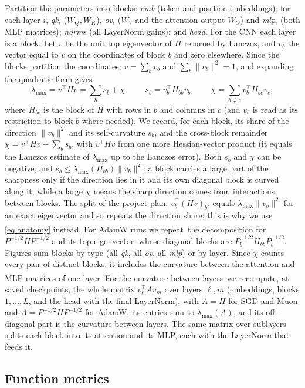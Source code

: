 \documentclass[10pt]{article}
\newcommand{\extra}{\textsuperscript{\dag}}  %
\newcommand{\lmax}{\lambda_{\max}}
\begin{document}
Partition the parameters into blocks: \emph{emb} (token and position embeddings); for each layer $i$,
\emph{qk}$_i$ ($W_Q,W_K$), \emph{ov}$_i$ ($W_V$ and the attention output $W_O$) and \emph{mlp}$_i$ (both MLP
matrices); \emph{norms} (all LayerNorm gains); and \emph{head}. For the CNN each layer is a block. Let $v$ be
the unit top eigenvector of $H$ returned by Lanczos, and $v_b$ the vector equal to $v$ on the coordinates of
block $b$ and zero elsewhere. Since the blocks partition the coordinates, $v=\sum_bv_b$ and
$\sum_b\|v_b\|^2=1$, and expanding the quadratic form gives
\begin{equation}
\lmax=v^\top Hv=\sum_b s_b+\chi,\qquad s_b=v_b^\top H_{bb}v_b,\qquad \chi=\sum_{b\neq c}v_b^\top H_{bc}v_c,
\label{eq:anatomy}
\end{equation}
where $H_{bc}$ is the block of $H$ with rows in $b$ and columns in $c$ (and $v_b$ is read as its restriction
to block $b$ where needed). We record, for each block, its share of the direction $\|v_b\|^2$ and its
self-curvature $s_b$, and the cross-block remainder $\chi=v^\top Hv-\sum_bs_b$, with $v^\top Hv$ from one more
Hessian-vector product (it equals the Lanczos estimate of $\lmax$ up to the Lanczos error). Both $s_b$ and
$\chi$ can be negative, and $s_b\le\lmax(H_{bb})\|v_b\|^2$: a block carries a large part of the sharpness only
if the direction lies in it and its own diagonal block is curved along it, while a large $\chi$ means the
sharp direction comes from interactions between blocks. The split of the project plan, $v_b^\top(Hv)_b$,
equals $\lmax\|v_b\|^2$ for an exact eigenvector and so repeats the direction share; this is why we use
\eqref{eq:anatomy} instead. For AdamW runs we repeat\extra\ the decomposition for $P^{-1/2}HP^{-1/2}$ and its top
eigenvector, whose diagonal blocks are $P_b^{-1/2}H_{bb}P_b^{-1/2}$. Figures sum blocks by type (all
\emph{qk}, all \emph{ov}, all \emph{mlp}) or by layer. Since $\chi$ counts every pair of distinct blocks, it
includes the curvature between the attention and MLP matrices of one layer. For the curvature between
layers\extra\ we recompute, at saved checkpoints, the whole matrix $v_\ell^\top Av_m$ over layers $\ell,m$
(embeddings, blocks $1,\dots,L$, and the head with the final LayerNorm), with $A=H$ for SGD and Muon and
$A=P^{-1/2}HP^{-1/2}$ for AdamW; its entries sum to $\lmax(A)$, and its off-diagonal part is the curvature
between layers. The same matrix over sublayers splits each block into its attention and its MLP, each with the
LayerNorm that feeds it.

\subsection{Function metrics}
\label{sec:method-metrics}
\end{document}
